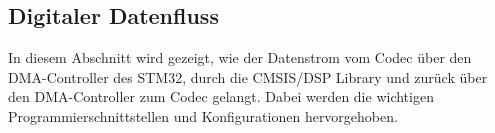 \subsection{Digitaler Datenfluss}
\label{sec:DSPKonzept}

In diesem Abschnitt wird gezeigt, wie der Datenstrom vom Codec über den DMA-Controller des STM32,
durch die CMSIS/DSP Library und zurück über den DMA-Controller zum Codec gelangt.
Dabei werden die wichtigen Programmierschnittstellen und Konfigurationen hervorgehoben.







